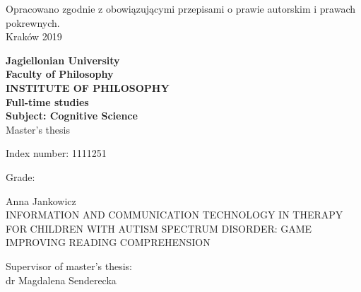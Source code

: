 \documentclass[a4paper,12pt]{report}
\newcommand{\authorname}{Anna Jankowicz}
\newcommand{\supname}{dr Magdalena Senderecka}
\begin{document}
{\centering\small{Opracowano zgodnie z obowiązującymi przepisami o prawie autorskim i prawach pokrewnych.}\\ \vspace{0.25cm}\Large{Kraków 2019\\}}

\newpage

\thispagestyle{empty}

{\centering\linespread{1.05}
    \textbf{
    {\Large Jagiellonian University\\}
    {\large Faculty of Philosophy\\
      \uppercase{INSTITUTE OF PHILOSOPHY}\\}
      \textbf{Full-time studies\\
      Subject: Cognitive Science}\\
    }
    \vspace{0.5cm}    
    {\large{Master's thesis\\}}
}

\vspace{1cm}
\begin{minipage}[t]{0.4\textwidth}
    \begin{flushleft} \large Index number: 1111251\\ \end{flushleft}
\end{minipage}
\begin{minipage}[t]{0.4\textwidth}
    \begin{flushright} \large Grade:\\ \end{flushright}
\end{minipage}

\vspace{0.3cm}
{\centering\LARGE{\authorname\\}}
\vspace{0.5cm}
{\centering\linespread{1.15}\LARGE{INFORMATION AND COMMUNICATION TECHNOLOGY IN THERAPY FOR CHILDREN WITH AUTISM SPECTRUM DISORDER: GAME IMPROVING READING COMPREHENSION\\}}

\vspace{4.5cm}
\begin{minipage}[t]{0.4\textwidth}
    \begin{flushleft} \large
    \end{flushleft}
\end{minipage}
\begin{minipage}[t]{0.5\textwidth}
    \begin{flushright} \large
    Supervisor of master's thesis:\\ \supname
    \end{flushright}
\end{minipage}
\vspace{2cm}
\end{document}
